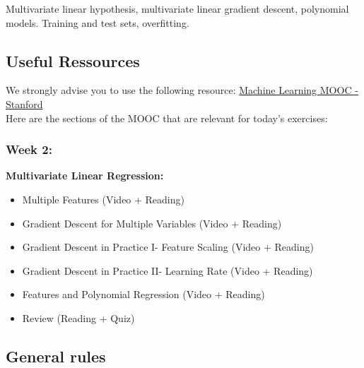 \documentclass[]{article}
\begin{document}
Multivariate linear hypothesis, multivariate linear gradient descent,
polynomial models. Training and test sets, overfitting.

\hypertarget{useful-ressources}{%
\subsection{Useful Ressources}\label{useful-ressources}}

We strongly advise you to use the following resource:
\href{https://www.coursera.org/learn/machine-learning/home/week/2}{Machine
Learning MOOC - Stanford}\\
Here are the sections of the MOOC that are relevant for today's
exercises:

\hypertarget{week-2}{%
\subsubsection{Week 2:}\label{week-2}}

\textbf{Multivariate Linear Regression:}

\begin{itemize}
\item
  Multiple Features (Video + Reading)
\item
  Gradient Descent for Multiple Variables (Video + Reading)
\item
  Gradient Descent in Practice I- Feature Scaling (Video + Reading)
\item
  Gradient Descent in Practice II- Learning Rate (Video + Reading)
\item
  Features and Polynomial Regression (Video + Reading)
\item
  Review (Reading + Quiz)
\end{itemize}

\hypertarget{general-rules}{%
\subsection{General rules}\label{general-rules}}
\end{document}
